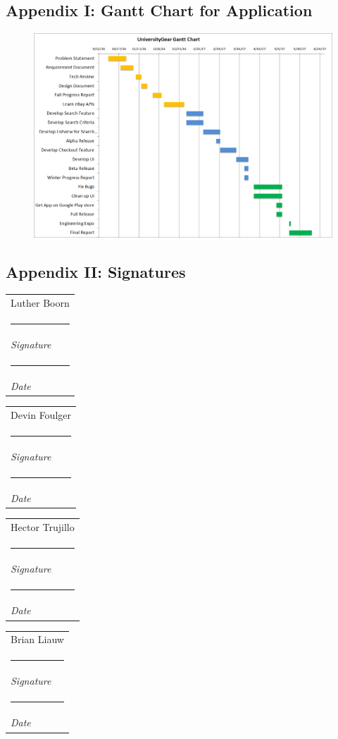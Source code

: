 \documentclass[journal,compsoc, 10pt, draftclsnofoot, onecolumn]{IEEEtran}
\makeatletter
\newcommand{\namesigdate}[2][6cm]{%
  \begin{tabular}{@{}p{#1}@{}}
    #2 \\[0.5\normalbaselineskip] \hrule \\[0pt]
    {\small \textit{Signature}} \\[0.5\normalbaselineskip] \hrule \\[0pt]
    {\small \textit{Date}}
  \end{tabular}
}
\makeatother
\begin{document}
\subsection{Appendix I: Gantt Chart for Application}
\begin{figure}[h]
\includegraphics[scale=.5]{ganttChart} 
\centering
\end{figure}
\newpage

\subsection{Appendix II: Signatures}

\vspace{2ex}\noindent 
\namesigdate{Luther Boorn} \hfill
\namesigdate{Devin Foulger} \hfill

\vspace{4ex}\noindent
\namesigdate{Hector Trujillo} \hfill
\namesigdate{Brian Liauw} \hfill
\end{document}
